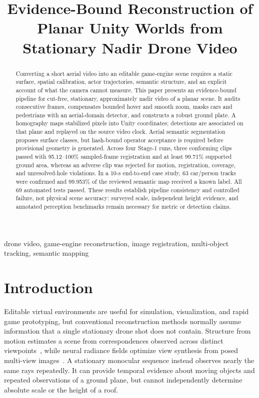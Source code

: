 \documentclass[letterpaper,conference]{IEEEtran}
\begin{document}
\title{Evidence-Bound Reconstruction of Planar Unity Worlds from Stationary Nadir Drone Video}

\author{
}

\maketitle

\begin{abstract}
Converting a short aerial video into an editable game-engine scene requires a static surface, spatial calibration, actor trajectories, semantic structure, and an explicit account of what the camera cannot measure. This paper presents an evidence-bound pipeline for cut-free, stationary, approximately nadir video of a planar scene. It audits consecutive frames, compensates bounded hover and smooth zoom, masks cars and pedestrians with an aerial-domain detector, and constructs a robust ground plate. A homography maps stabilized pixels into Unity coordinates; detections are associated on that plane and replayed on the source video clock. Aerial semantic segmentation proposes surface classes, but hash-bound operator acceptance is required before provisional geometry is generated. Across four Stage-1 runs, three conforming clips passed with 95.12--100\% sampled-frame registration and at least 99.71\% supported ground area, whereas an adverse clip was rejected for motion, registration, coverage, and unresolved-hole violations. In a 10-s end-to-end case study, 63 car/person tracks were confirmed and 99.953\% of the reviewed semantic map received a known label. All 69 automated tests passed. These results establish pipeline consistency and controlled failure, not physical scene accuracy: surveyed scale, independent height evidence, and annotated perception benchmarks remain necessary for metric or detection claims.
\end{abstract}

\begin{IEEEkeywords}
drone video, game-engine reconstruction, image registration, multi-object tracking, semantic mapping
\end{IEEEkeywords}

\section{Introduction}
Editable virtual environments are useful for simulation, visualization, and rapid game prototyping, but conventional reconstruction methods normally assume information that a single stationary drone shot does not contain. Structure from motion estimates a scene from correspondences observed across distinct viewpoints~\cite{schonberger2016sfm}, while neural radiance fields optimize view synthesis from posed multi-view images~\cite{mildenhall2020nerf}. A stationary monocular sequence instead observes nearly the same rays repeatedly. It can provide temporal evidence about moving objects and repeated observations of a ground plane, but cannot independently determine absolute scale or the height of a roof.
\end{document}
